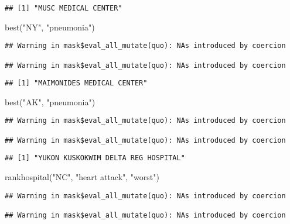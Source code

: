 \documentclass[
]{article}
\newenvironment{Shaded}{\begin{snugshade}}{\end{snugshade}}
\newcommand{\FunctionTok}[1]{\textcolor[rgb]{0.00,0.00,0.00}{#1}}
\newcommand{\NormalTok}[1]{#1}
\newcommand{\StringTok}[1]{\textcolor[rgb]{0.31,0.60,0.02}{#1}}
\begin{document}
\begin{verbatim}
## [1] "MUSC MEDICAL CENTER"
\end{verbatim}

\begin{Shaded}
\begin{Highlighting}[]
\FunctionTok{best}\NormalTok{(}\StringTok{"NY"}\NormalTok{, }\StringTok{"pneumonia"}\NormalTok{)}
\end{Highlighting}
\end{Shaded}

\begin{verbatim}
## Warning in mask$eval_all_mutate(quo): NAs introduced by coercion

## Warning in mask$eval_all_mutate(quo): NAs introduced by coercion
\end{verbatim}

\begin{verbatim}
## [1] "MAIMONIDES MEDICAL CENTER"
\end{verbatim}

\begin{Shaded}
\begin{Highlighting}[]
\FunctionTok{best}\NormalTok{(}\StringTok{"AK"}\NormalTok{, }\StringTok{"pneumonia"}\NormalTok{)}
\end{Highlighting}
\end{Shaded}

\begin{verbatim}
## Warning in mask$eval_all_mutate(quo): NAs introduced by coercion

## Warning in mask$eval_all_mutate(quo): NAs introduced by coercion
\end{verbatim}

\begin{verbatim}
## [1] "YUKON KUSKOKWIM DELTA REG HOSPITAL"
\end{verbatim}

\begin{Shaded}
\begin{Highlighting}[]
\FunctionTok{rankhospital}\NormalTok{(}\StringTok{"NC"}\NormalTok{, }\StringTok{"heart attack"}\NormalTok{, }\StringTok{"worst"}\NormalTok{)}
\end{Highlighting}
\end{Shaded}

\begin{verbatim}
## Warning in mask$eval_all_mutate(quo): NAs introduced by coercion

## Warning in mask$eval_all_mutate(quo): NAs introduced by coercion
\end{verbatim}
\end{document}
